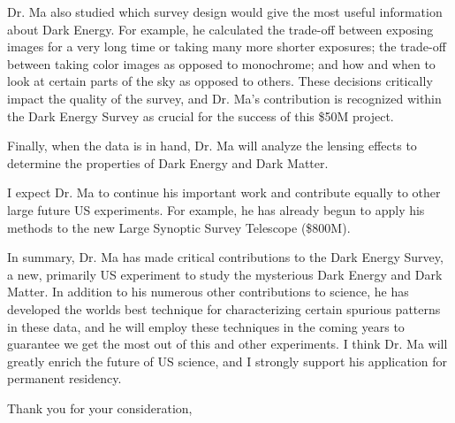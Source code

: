 \documentclass[12pt]{letter}
\begin{document}
\begin{letter}{}
Dr. Ma also studied which survey design would give the most useful information
about Dark Energy.  For example, he calculated the trade-off between exposing
images for a very long time or taking many more shorter exposures; the
trade-off between taking color images as opposed to monochrome; and how and
when to look at certain parts of the sky as opposed to others.  These decisions
critically impact the quality of the survey, and Dr. Ma's contribution is
recognized within the Dark Energy Survey as crucial for the success of this
\$50M project.

Finally, when the data is in hand, Dr. Ma will analyze the lensing effects
to determine the properties of Dark Energy and Dark Matter.

I expect Dr. Ma to continue his important work and contribute equally to other
large future US experiments.  For example, he has already begun to apply his
methods to the new Large Synoptic Survey Telescope (\$800M). 

In summary, Dr. Ma has made critical contributions to the Dark Energy Survey, a
new, primarily US experiment to study the mysterious Dark Energy and Dark
Matter.  In addition to his numerous other contributions to science, he has
developed the worlds best technique for characterizing certain spurious
patterns in these data, and he will employ these techniques in the coming years
to guarantee we get the most out of this and other experiments.     I think Dr.
Ma will greatly enrich the future of US science, and I strongly support his
application for permanent residency. 

\closing{Thank you for your consideration,}

\end{letter}
\end{document}
